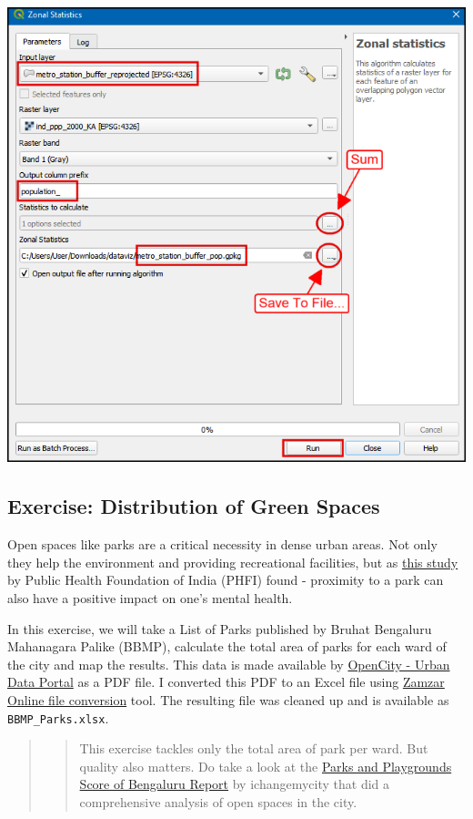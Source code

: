 \documentclass[
  12pt,
  a4paper]{article}
\begin{document}
\begin{center}\includegraphics[width=0.75\linewidth]{images/spatial_data_viz/pop18} \end{center}

\newpage

\hypertarget{exercise-distribution-of-green-spaces}{%
\subsection{Exercise: Distribution of Green
Spaces}\label{exercise-distribution-of-green-spaces}}

Open spaces like parks are a critical necessity in dense urban areas.
Not only they help the environment and providing recreational
facilities, but as
\href{https://www.google.com/earth/outreach/success-stories/public-health-foundation-of-india/}{this
study} by Public Health Foundation of India (PHFI) found - proximity to
a park can also have a positive impact on one's mental health.

In this exercise, we will take a List of Parks published by Bruhat
Bengaluru Mahanagara Palike (BBMP), calculate the total area of parks
for each ward of the city and map the results. This data is made
available by \href{http://opencity.in}{OpenCity - Urban Data Portal} as
a PDF file. I converted this PDF to an Excel file using
\href{https://www.zamzar.com/convert/pdf-to-xls/}{Zamzar Online file
conversion} tool. The resulting file was cleaned up and is available as
\texttt{BBMP\_Parks.xlsx}.

\begin{quote}
\begin{quote}
This exercise tackles only the total area of park per ward. But quality
also matters. Do take a look at the
\href{https://www.ichangemycity.com/pdf/parks-playgrounds-survey-report.pdf}{Parks
and Playgrounds Score of Bengaluru Report} by ichangemycity that did a
comprehensive analysis of open spaces in the city.
\end{quote}
\end{quote}
\end{document}
